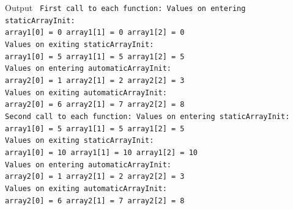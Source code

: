 \documentclass[10pt]{beamer}
\begin{document}
\begin{frame}
	
\end{frame}
\begin{frame}
	
\end{frame}
\begin{frame}
	\begin{block}{\color{white}Output}
		\texttt{\footnotesize
		First call to each function:
		\linebreak \linebreak
		Values on entering staticArrayInit:\\
		array1[0] = 0 array1[1] = 0 array1[2] = 0\\
		Values on exiting staticArrayInit:\\
		array1[0] = 5 array1[1] = 5 array1[2] = 5\\
		\linebreak 
		\vspace{8pt}
		\linebreak
		Values on entering automaticArrayInit:\\
		array2[0] = 1 array2[1] = 2 array2[2] = 3\\
		Values on exiting automaticArrayInit:\\
		array2[0] = 6 array2[1] = 7 array2[2] = 8\\
		\linebreak 
		\vspace{8pt}
		\linebreak
		Second call to each function:
		\linebreak 
		\linebreak
		Values on entering staticArrayInit:\\
		array1[0] = 5 array1[1] = 5 array1[2] = 5\\
		Values on exiting staticArrayInit:\\
		array1[0] = 10 array1[1] = 10 array1[2] = 10\\
		\linebreak 
		\vspace{8pt}
		\linebreak
		Values on entering automaticArrayInit:\\
		array2[0] = 1 array2[1] = 2 array2[2] = 3\\
		Values on exiting automaticArrayInit:\\
		array2[0] = 6 array2[1] = 7 array2[2] = 8}
	\end{block}
\end{frame}
\end{document}
